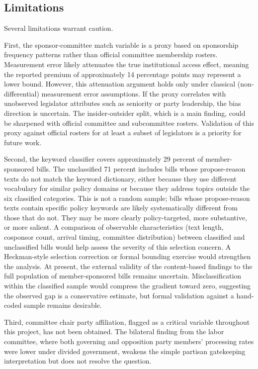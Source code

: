 \documentclass[11pt]{article}
\begin{document}
\subsection{Limitations}\label{sec:limitations}

Several limitations warrant caution.

First, the sponsor-committee match variable is a proxy based on sponsorship frequency patterns rather than official committee membership rosters. Measurement error likely attenuates the true institutional access effect, meaning the reported premium of approximately 14 percentage points may represent a lower bound. However, this attenuation argument holds only under classical (non-differential) measurement error assumptions. If the proxy correlates with unobserved legislator attributes such as seniority or party leadership, the bias direction is uncertain. The insider-outsider split, which is a main finding, could be sharpened with official committee and subcommittee rosters. Validation of this proxy against official rosters for at least a subset of legislators is a priority for future work.

Second, the keyword classifier covers approximately 29 percent of member-sponsored bills. The unclassified 71 percent includes bills whose propose-reason texts do not match the keyword dictionary, either because they use different vocabulary for similar policy domains or because they address topics outside the six classified categories. This is not a random sample; bills whose propose-reason texts contain specific policy keywords are likely systematically different from those that do not. They may be more clearly policy-targeted, more substantive, or more salient. A comparison of observable characteristics (text length, cosponsor count, arrival timing, committee distribution) between classified and unclassified bills would help assess the severity of this selection concern. A Heckman-style selection correction or formal bounding exercise would strengthen the analysis. At present, the external validity of the content-based findings to the full population of member-sponsored bills remains uncertain. Misclassification within the classified sample would compress the gradient toward zero, suggesting the observed gap is a conservative estimate, but formal validation against a hand-coded sample remains desirable.

Third, committee chair party affiliation, flagged as a critical variable throughout this project, has not been obtained. The bilateral finding from the labor committee, where both governing and opposition party members' processing rates were lower under divided government, weakens the simple partisan gatekeeping interpretation but does not resolve the question.
\end{document}
